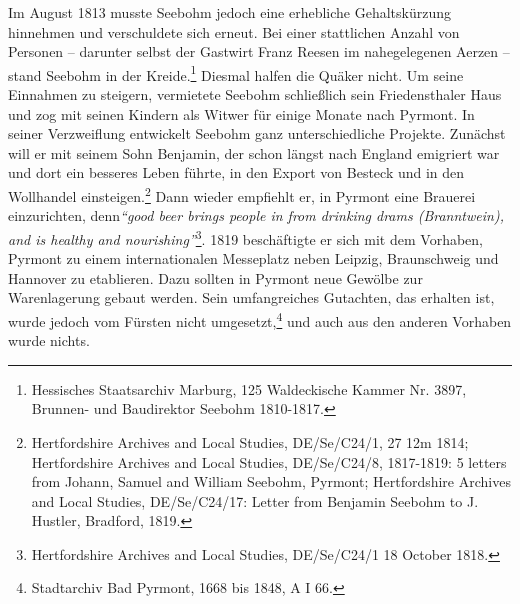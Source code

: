 \medskip

Im August 1813 musste Seebohm jedoch eine erhebliche Gehaltskürzung hinnehmen
und verschuldete sich erneut. Bei einer stattlichen Anzahl von Personen --
darunter selbst der Gastwirt Franz Reesen im nahegelegenen Aerzen -- stand Seebohm in der
Kreide.\footnote{Hessisches Staatsarchiv Marburg, 125 Waldeckische Kammer Nr.
3897, Brunnen-
und Baudirektor Seebohm 1810-1817.} Diesmal halfen die Quäker nicht. Um seine
Einnahmen zu steigern, vermietete Seebohm schließlich sein Friedensthaler Haus
und zog mit seinen Kindern als Witwer für einige Monate nach Pyrmont. In seiner
Verzweiflung entwickelt Seebohm ganz unterschiedliche Projekte. Zunächst will er
mit seinem Sohn Benjamin, der schon längst
nach England emigriert war und dort ein
besseres Leben führte, in den Export von Besteck und in den
Wollhandel einsteigen.\footnote{Hertfordshire Archives and Local Studies,
DE/Se/C24/1, 27 12m 1814;
Hertfordshire Archives and Local Studies, DE/Se/C24/8, 1817-1819: 5 letters from
Johann, Samuel and William Seebohm, Pyrmont; Hertfordshire Archives and Local
Studies, DE/Se/C24/17: Letter from Benjamin Seebohm to J. Hustler, Bradford,
1819.}
Dann wieder empfiehlt er, in Pyrmont eine
Brauerei einzurichten, denn\textit{"`good beer
brings people in from drinking drams (Branntwein), and is healthy and
nourishing"'}\footnote{Hertfordshire Archives and Local Studies, DE/Se/C24/1 18
October 1818.}. 1819 beschäftigte er sich mit dem Vorhaben, Pyrmont zu einem
internationalen Messeplatz neben Leipzig, Braunschweig und Hannover zu
etablieren. Dazu sollten in Pyrmont neue Gewölbe zur Warenlagerung gebaut
werden. Sein umfangreiches Gutachten, das erhalten ist, wurde jedoch vom Fürsten
nicht umgesetzt,\footnote{Stadtarchiv Bad Pyrmont, 1668 bis 1848, A I 66.} und
auch aus den anderen Vorhaben wurde nichts.

\medskip

